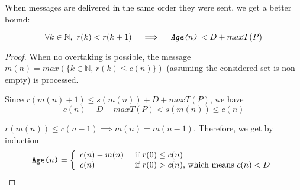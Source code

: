 When messages are delivered in the same order they were sent, we get a better bound:

\begin{thm}\label{maxAge2}
\[ \forall k \in \mathbb{N},\,\, r(k) < r(k+1) \quad \implies \quad
\texttt{\emph{Age($n$)}} < D + maxT(P) \]
\end{thm}

\begin{proof}
When no overtaking is possible, the message $m(n) = max(\{k\in \mathbb{N},\, r(k) \leq c(n)\})$ (assuming the considered set is non empty) is processed. 

Since $r(m(n)+1) \leq s(m(n)) + D + maxT(P)$, we have 
\[ c(n) - D -maxT(P) < s(m(n)) \leq c(n) \]

$r(m(n)) \leq c(n-1) \implies m(n) = m(n-1)$. Therefore, we get by induction 
\[ \texttt{Age($n$)} = 
\left\{ \begin{array}{ll}
c(n) - m(n) &\textrm{ if $ r(0) \leq c(n)$}\\
c(n) &\textrm{ if $ r(0) > c(n)$, which means $c(n) < D$}
\end{array}\right.
\]
\end{proof}


